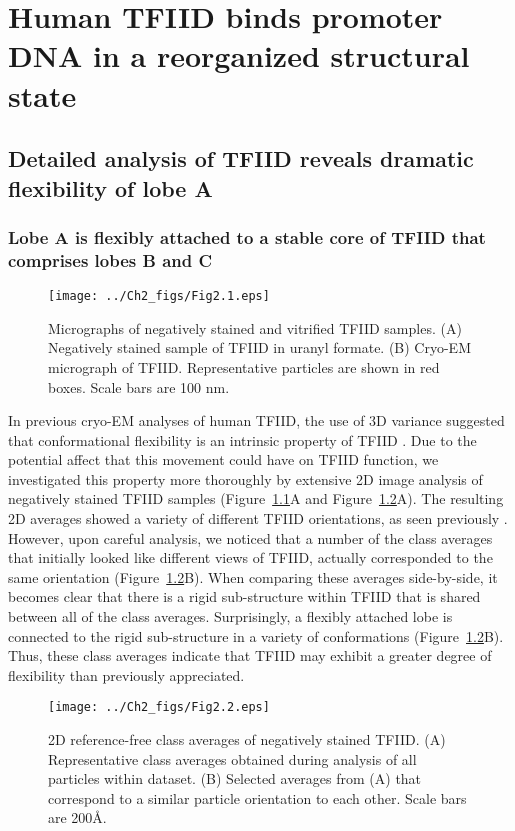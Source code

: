 \chapter{Human TFIID binds promoter DNA in a reorganized structural state}

\section{Detailed analysis of TFIID reveals dramatic flexibility of lobe A}

\subsection{Lobe A is flexibly attached to a stable core of TFIID that comprises lobes B and C} 
\begin{figure}
\centering
\texttt{[image: ../Ch2\_figs/Fig2.1.eps]}
\caption[Micrographs of negatively stained and vitrified TFIID samples]{Micrographs of negatively stained and vitrified TFIID samples. (A) Negatively stained sample of TFIID in uranyl formate.  (B) Cryo-EM micrograph of TFIID.  Representative particles are shown in red boxes.  Scale bars are 100 nm.} 
\label{fig:Fig2.1}
\end{figure}
In previous cryo-EM analyses of human TFIID, the use of 3D variance suggested that conformational flexibility is an intrinsic property of TFIID \cite{Grob_1281}. Due to the potential affect that this movement could have on TFIID function, we investigated this property more thoroughly by extensive 2D image analysis of negatively stained TFIID samples (Figure~\ref{fig:Fig2.1}A and Figure~\ref{fig:Fig2.2}A). The resulting 2D averages showed a variety of different TFIID orientations, as seen previously \cite{Grob_1281}. However, upon careful analysis, we noticed that a number of the class averages that initially looked like different views of TFIID, actually corresponded to the same orientation (Figure~\ref{fig:Fig2.2}B). When comparing these averages side-by-side, it becomes clear that there is a rigid sub-structure within TFIID that is shared between all of the class averages. Surprisingly, a flexibly attached lobe is connected to the rigid sub-structure in a variety of conformations (Figure~\ref{fig:Fig2.2}B). Thus, these class averages indicate that TFIID may exhibit a greater degree of flexibility than previously appreciated.\\
\begin{figure}
\centering
\texttt{[image: ../Ch2\_figs/Fig2.2.eps]}
\caption[2D reference-free class averages of negatively stained TFIID]{2D reference-free class averages of negatively stained TFIID. (A) Representative class averages obtained during analysis of all particles within dataset. (B) Selected averages from (A) that correspond to a similar particle orientation to each other. Scale bars are 200\AA.} 
\label{fig:Fig2.2}
\end{figure}

